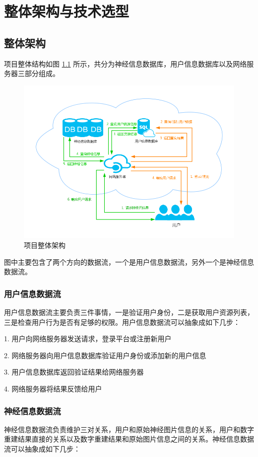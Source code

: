 \chapter{整体架构与技术选型}

\section{整体架构}
项目整体结构如图 \ref{server} 所示，共分为神经信息数据库，用户信息数据库以及网络服务器三部分组成。
\begin{figure}
\centering
\includegraphics[width=148mm]{images/server}
\caption{项目整体架构}
\label{server}
\end{figure}
图中主要包含了两个方向的数据流，一个是用户信息数据流，另外一个是神经信息数据流。

\subsection{用户信息数据流}
用户信息数据流主要负责三件事情，一是验证用户身份，二是获取用户资源列表，三是检查用户行为是否有足够的权限。用户信息数据流可以抽象成如下几步：

1. 用户向网络服务器发送请求，登录平台或注册新用户

2. 网络服务器向用户信息数据库验证用户身份或添加新的用户信息

3. 用户信息数据库返回验证结果给网络服务器

4. 网络服务器将结果反馈给用户

\subsection{神经信息数据流}
神经信息数据流负责维护三对关系，用户和原始神经图片信息的关系，用户和数字重建结果直接的关系以及数字重建结果和原始图片信息之间的关系。神经信息数据流可以抽象成如下几步：

